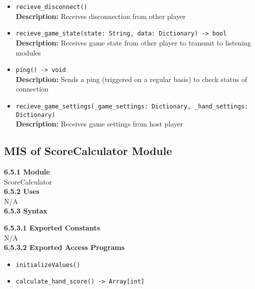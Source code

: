 \documentclass[12pt, titlepage]{article}
\begin{document}
\begin{itemize}
    \item \texttt{recieve\_disconnect()}\\
    \textbf{Description:} Receives disconnection from other player
    
    \item \texttt{recieve\_game\_state(state: String, data: Dictionary) -> bool}\\
    \textbf{Description:} Receives game state from other player to transmit to listening modules
    
    \item \texttt{ping() -> void}\\
    \textbf{Description:} Sends a ping (triggered on a regular basis) to check status of connection
    
    \item \texttt{recieve\_game\_settings(\_game\_settings: Dictionary, \_hand\_settings: Dictionary)}\\
    \textbf{Description:} Receives game settings from host player
\end{itemize}


\subsection{MIS of ScoreCalculator Module}
\textbf{6.5.1 Module}\\
 ScoreCalculator\\

\noindent \textbf{6.5.2 Uses}\\

N/A \\

\noindent \textbf{6.5.3 Syntax}

\noindent \textbf{6.5.3.1 Exported Constants}\\

 \noindent N/A\\

\textbf{6.5.3.2 Exported Access Programs}
\begin{itemize}
	\item \texttt{initializeValues()}
	\item \texttt{calculate\_hand\_score() -> Array[int]}
	
\end{itemize}
\end{document}

